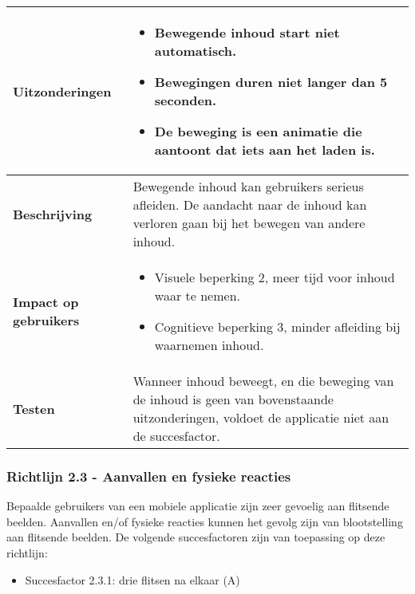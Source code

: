 \begin{table}[H]
\begin{tabular}{|l|p{12cm}|}
        \hline
        \textbf{Uitzonderingen}     & 
        \begin{itemize}
            \item Bewegende inhoud start niet automatisch.
            \item Bewegingen duren niet langer dan 5 seconden.
            \item De beweging is een animatie die aantoont dat iets aan het laden is.
        \end{itemize}                                                                                                                                                                                                   \\ 
        \hline
        \textbf{Beschrijving}                 & Bewegende inhoud kan gebruikers serieus afleiden. De aandacht naar de inhoud kan verloren gaan bij het bewegen van andere inhoud. \\ 
        \hline
        \textbf{Impact op gebruikers}         &  
        \begin{itemize}
            \item Visuele beperking 2, meer tijd voor inhoud waar te nemen.
            \item Cognitieve beperking 3, minder afleiding bij waarnemen inhoud.
        \end{itemize}                                                                                                                                                                                                                                                                                                                                                                                                                    \\ 
        \hline
        \textbf{Testen}                       & Wanneer inhoud beweegt, en die beweging van de inhoud is geen van bovenstaande uitzonderingen, voldoet de applicatie niet aan de succesfactor.                                                                                                                                                                                                                  \\
        \hline
    \end{tabular}
    
\end{table}

\subsubsection{Richtlijn 2.3 - Aanvallen en fysieke reacties}
Bepaalde gebruikers van een mobiele applicatie zijn zeer gevoelig aan flitsende beelden. Aanvallen en/of fysieke reacties kunnen het gevolg zijn van blootstelling aan flitsende beelden. De volgende succesfactoren zijn van toepassing op deze richtlijn: 
\begin{itemize}
    \item Succesfactor 2.3.1: drie flitsen na elkaar (A)
\end{itemize}

